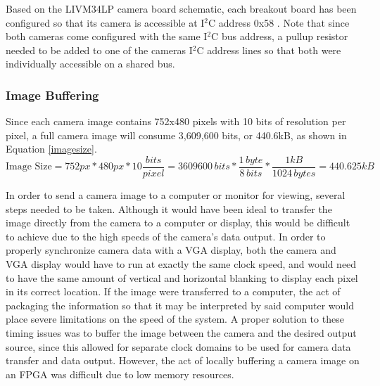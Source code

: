 Based on the LIVM34LP camera board schematic, each breakout board has been configured so that its camera is accessible at I$^2$C address 0x58 \cite{livm34lp,mt9v034}. Note that since both cameras come configured with the same I$^2$C bus address, a pullup resistor needed to be added to one of the cameras I$^2$C address lines so that both were individually accessible on a shared bus.

\subsubsection{Image Buffering}
Since each camera image contains 752x480 pixels with 10 bits of resolution per pixel, a full camera image will consume 3,609,600 bits, or 440.6kB, as shown in Equation \ref{imagesize}.
\begin{equation} \label{imagesize}
\textrm{Image Size} = 752px*480px*10\frac{bits}{pixel} = 3609600\,bits*\frac{1\,byte}{8\,bits}*\frac{1 kB}{1024\,bytes} = 440.625kB
\end{equation}
\par
In order to send a camera image to a computer or monitor for viewing, several steps needed to be taken. Although it would have been ideal to transfer the image directly from the camera to a computer or display, this would be difficult to achieve due to the high speeds of the camera's data output. In order to properly synchronize camera data with a VGA display, both the camera and VGA display would have to run at exactly the same clock speed, and would need to have the same amount of vertical and horizontal blanking to display each pixel in its correct location. If the image were transferred to a computer, the act of packaging the information so that it may be interpreted by said computer would place severe limitations on the speed of the system. A proper solution to these timing issues was to buffer the image between the camera and the desired output source, since this allowed for separate clock domains to be used for camera data transfer and data output. However, the act of locally buffering a camera image on an FPGA was difficult due to low memory resources. 
\par
